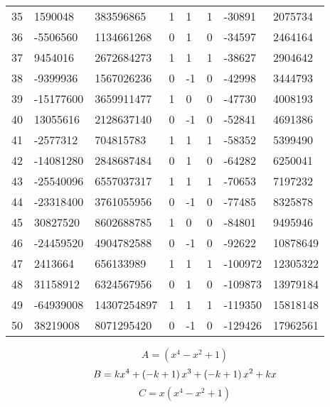 \documentclass{amsart}
\begin{document}
\begin{longtable}{|l|l|l|lllll|}
35&1590048&383596865&1&1&1&-30891&2075734\\
36&-5506560&1134661268&0&1&0&-34597&2464164\\
37&9454016&2672684273&1&1&1&-38627&2904642\\
38&-9399936&1567026236&0&-1&0&-42998&3444793\\
39&-15177600&3659911477&1&0&0&-47730&4008193\\
40&13055616&2128637140&0&-1&0&-52841&4691386\\
41&-2577312&704815783&1&1&1&-58352&5399490\\
42&-14081280&2848687484&0&1&0&-64282&6250041\\
43&-25540096&6557037317&1&1&1&-70653&7197232\\
44&-23318400&3761055956&0&-1&0&-77485&8325878\\
45&30827520&8602688785&1&0&0&-84801&9495946\\
46&-24459520&4904782588&0&-1&0&-92622&10878649\\
47&2413664&656133989&1&1&1&-100972&12305322\\
48&31158912&6324567956&0&1&0&-109873&13979184\\
49&-64939008&14307254897&1&1&1&-119350&15818148\\
50&38219008&8071295420&0&-1&0&-129426&17962561\\
\hline
\end{longtable}
$$A=(x^4
 - x^2
 + 1)$$
$$B=k\*x^4
 + \left(-k
 + 1\right) \*x^3
 + \left(-k
 + 1\right) \*x^2
 + k\*x$$
$$C=x(x^4
 - x^2
 + 1)$$
\end{document}
